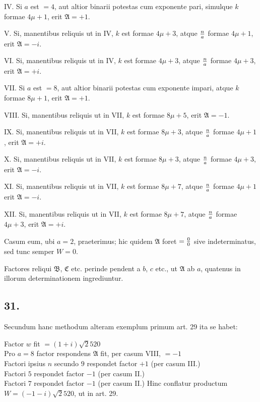 \documentclass[twoside,12pt]{memoir}
\renewenvironment{quote}%
  {\list{}{\leftmargin=5em\rightmargin=0em}\item[]}%
  {\endlist}
\let\oldfrac\frac
\def\frac#1#2{\mathchoice{\tfrac{#1}{#2}}{\oldfrac{#1}{#2}}{\genfrac{}{}{}{2}{#1}{#2\mathstrut}}{\genfrac{}{}{}{3}{#1}{#2\mathstrut}}}
\begin{document}
IV. Si \(a\) est \(=4\), aut altior binarii potestas cum exponente pari, simulque \(k\) formae \(4 \mu+1\), erit \(\mathfrak{A}=+1\).
 
V. Si, manentibus reliquis ut in IV, \(k\) est formae \(4 \mu+3\), atque \(\frac{n}{a}\) formae \(4 \mu+1\), erit \(\mathfrak{A}=-i\).
 
VI. Si, manentibus reliquis ut in IV, \(k\) est formae \(4 \mu+3\), atque \(\frac{n}{a}\) formae \(4 \mu+3\), erit \(\mathfrak{A}=+i\).
 
VII. Si \(a\) est \(=8\), aut altior binarii potestas cum exponente impari, atque \(k\) formae \(8 \mu+1\), erit \(\mathfrak{A}=+1\).
 
VIII. Si, manentibus reliquis ut in VII, \(k\) est formae \(8 \mu+5\), erit \(\mathfrak{A}=-1\).
 
IX. Si, manentibus reliquis ut in VII, \(k\) est formae \(8 \mu+3\), atque \(\frac{n}{a}\) formae \(4 \mu+1\), erit \(\mathfrak{A}=+i\).\pagebreak%
 
X. Si, manentibus reliquis ut in VII, \(k\) est formae \(8 \mu+3\), atque \(\frac{n}{a}\) formae \(4 \mu+3\), erit \(\mathfrak{A}=-i\).
 
XI. Si, manentibus reliquis ut in VII, \(k\) est formae \(8 \mu+7\), atque \(\frac{n}{a}\) formae \(4 \mu+1\) erit \(\mathfrak{A}=-i\).
 
XII. Si, manentibus reliquis ut in VII, \(k\) est formae \(8 \mu+7\), atque \(\frac{n}{a}\) formae \(4 \mu+3\), erit \(\mathfrak{A}=+i\).
 
Casum eum, ubi \(a=2\), praeterimus; hic quidem \(\mathfrak{A}\) foret \(=\frac{0}{0}\) sive indeterminatus, sed tunc semper \(W=0\).
 
Factores reliqui \(\mathfrak{B}\), \(\mathfrak{C}\) etc. perinde pendent a \(b\), \(c\) etc., ut \(\mathfrak{A}\) ab \(a\), quatenus in illorum determinationem ingrediuntur.

\subsection*{31.}
 
Secundum hanc methodum alteram exemplum primum art. 29 ita se habet:
\begin{quote}Factor \(w\) fit \(=(1+i) \surd 2520\)\\
Pro \(a=8\) factor respondens \(\mathfrak{A}\) fit, per casum VIII, \(=-1\)\\
Factori ipsius \(n\) secundo \(9\) respondet factor \(+1\) (per casum III.)\\
Factori \(5\) respondet factor \(-1\) (per casum II.)\\
Factori \(7\) respondet factor \(-1\) (per casum II.)\end{quote}
Hinc conflatur productum \(W=(-1-i) \surd 2520\), ut in art. 29.
\end{document}
